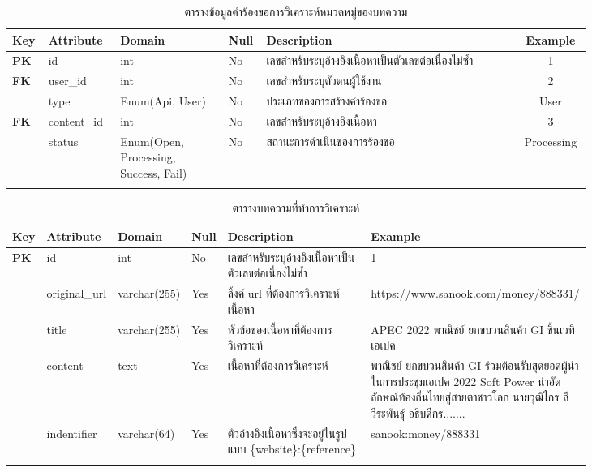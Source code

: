 \documentclass[12pt,oneside,openright,a4paper]{cpe-thai-project}
\begin{document}
\begin{longtable}{p{0.03\linewidth}|p{0.1\linewidth}|p{0.17\linewidth}|m{0.03\linewidth}|p{0.4\linewidth}|p{0.1\linewidth}}
  \caption{ตารางข้อมูลคำร้องขอการวิเคราะห์หมวดหมู่ของบทความ}\label{tbl:ticket}  \\
  \hhline{======} 
  \textbf{Key} & \textbf{Attribute} & \textbf{Domain} & \textbf{Null} & \textbf{Description} &\multicolumn{1}{c}{\textbf{Example}}  \\ \hline
  \endfirsthead
  \endhead
  \textbf{PK} & id      & int         & No & เลขสำหรับระบุอ้างอิงเนื้อหาเป็นตัวเลขต่อเนื่องไม่ซ้ำ      & \multicolumn{1}{c}{1}          \\ \hline
  \textbf{FK} & user\_id & int         & No & เลขสำหรับระบุตัวตนผู้ใช้งาน                       & \multicolumn{1}{c}{2}     \\ \hline
  \textbf{ }   & type & Enum(Api, User)     & No & ประเภทของการสร้างคำร้องขอ                 & \multicolumn{1}{c}{User}        \\ \hline
  \textbf{FK} & content\_id & int         & No & เลขสำหรับระบุอ้างอิงเนื้อหา                       & \multicolumn{1}{c}{3}     \\ \hline
  \textbf{ }   & status & Enum(Open, Processing, Success, Fail)         & No & สถานะการดำเนินของการร้องขอ   & \multicolumn{1}{c}{Processing}     \\ 
  \hhline{======}
\end{longtable}

\begin{longtable}{p{0.03\linewidth}|p{0.1\linewidth}|p{0.1\linewidth}|m{0.03\linewidth}|p{0.27\linewidth}|p{0.3\linewidth}}
  \caption{ตารางบทความที่ทำการวิเคราะห์} \label{tbl:content}\\
  \hhline{======}
  \textbf{Key} & \textbf{Attribute} & \textbf{Domain} & \textbf{Null} & \textbf{Description} & \textbf{Example} \\ \hline
  \endfirsthead
  \endhead
  \textbf{PK} & id & int &  No & เลขสำหรับระบุอ้างอิงเนื้อหาเป็นตัวเลขต่อเนื่องไม่ซ้ำ & 1 \\\hline
  \textbf{} & original\_url & varchar(255) & Yes & ลิ้งค์ url ที่ต้องการวิเคราะห์เนื้อหา & https://www.sanook.com/money/888331/ \\\hline
  \textbf{} & title & varchar(255) & Yes & หัวข้อของเนื้อหาที่ต้องการวิเคราะห์ & APEC 2022 พาณิชย์ ยกขบวนสินค้า GI ขึ้นเวทีเอเปค \\ \hline
  \textbf{} & content & text & Yes & เนื้อหาที่ต้องการวิเคราะห์ & พาณิชย์ ยกขบวนสินค้า GI ร่วมต้อนรับสุดยอดผู้นำในการประชุมเอเปค 2022 Soft Power นำอัตลักษณ์ท้องถิ่นไทยสู่สายตาชาวโลก นายวุฒิไกร ลีวีระพันธุ์ อธิบดีกร....... \\ \hline
  \textbf{} & indentifier & varchar(64) & Yes & ตัวอ้างอิงเนื้อหาซึ่งจะอยู่ในรูปแบบ \{website\}:\{reference\} & sanook:money/888331 \\ 
  \hhline{======}
\end{longtable}
\end{document}
